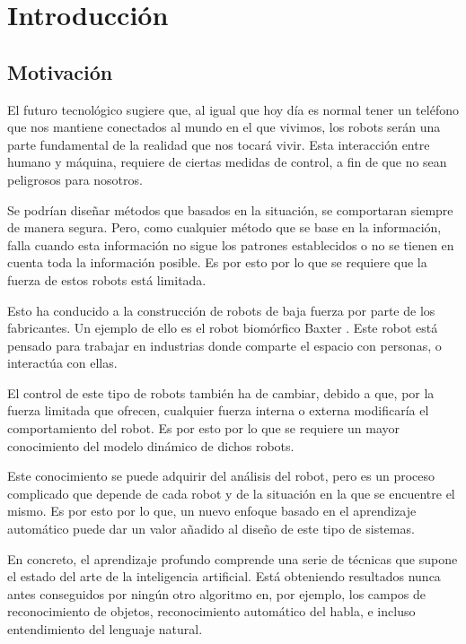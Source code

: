 \chapter{Introducción}
\section{Motivación}
El futuro tecnológico sugiere que, al igual que hoy día es normal tener un teléfono que nos mantiene conectados al mundo en el que vivimos, los robots serán una parte fundamental de la realidad que nos tocará vivir. Esta interacción entre humano y máquina, requiere de ciertas medidas de control, a fin de que no sean peligrosos para nosotros.

Se podrían diseñar métodos que basados en la situación, se comportaran siempre de manera segura. Pero, como cualquier método que se base en la información, falla cuando esta información no sigue los patrones establecidos o no se tienen en cuenta toda la información posible. Es por esto por lo que se requiere que la fuerza de estos robots está limitada.

Esto ha conducido a la construcción de robots de baja fuerza por parte de los fabricantes. Un ejemplo de ello es el robot biomórfico Baxter \cite{baxter}. Este robot está pensado para trabajar en industrias donde comparte el espacio con personas, o interactúa con ellas.

El control de este tipo de robots \cite{kulakowski2007dynamic}\cite{brosilow2002techniques}\cite{tolu2013adaptive}\cite{tolu2012bio}  también ha de cambiar, debido a que, por la fuerza limitada que ofrecen, cualquier fuerza interna o externa modificaría el comportamiento del robot. Es por esto por lo que se requiere un mayor conocimiento del modelo dinámico de dichos robots.

Este conocimiento se puede adquirir del análisis del robot, pero es un proceso complicado que depende de cada robot y de la situación en la que se encuentre el mismo. Es por esto por lo que, un nuevo enfoque basado en el aprendizaje automático \cite{andrewng}\cite{abu2012learning} puede dar un valor añadido al diseño de este tipo de sistemas.

En concreto, el aprendizaje profundo \cite{udacitydeeplearning}\cite{hinton} comprende una serie de técnicas que supone el estado del arte de la inteligencia artificial. Está obteniendo resultados nunca antes conseguidos por ningún otro algoritmo en, por ejemplo, los campos de reconocimiento de objetos, reconocimiento automático del habla, e incluso entendimiento del lenguaje natural.

